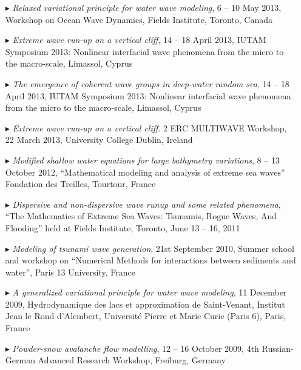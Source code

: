 \begin{itemize}
  \item[$\blacktriangleright$] \textit{Relaxed variational principle for water wave modeling}, 6 -- 10 May 2013, Workshop on Ocean Wave Dynamics, Fields Institute, Toronto, Canada

  \item[$\blacktriangleright$] \textit{Extreme wave run-up on a vertical cliff}, 14 -- 18 April 2013, IUTAM Symposium 2013: Nonlinear interfacial wave phenomena from the micro to the macro-scale, Limassol, Cyprus
  
  \item[$\blacktriangleright$] \textit{The emergence of coherent wave groups in deep-water random sea}, 14 -- 18 April 2013, IUTAM Symposium 2013: Nonlinear interfacial wave phenomena from the micro to the macro-scale, Limassol, Cyprus

  \item[$\blacktriangleright$] \textit{Extreme wave run-up on a vertical cliff}. 2 ERC MULTIWAVE Workshop, 22 March 2013, University College Dublin, Ireland

  \item[$\blacktriangleright$] \textit{Modified shallow water equations for large bathymetry variations}, 8 -- 13 October 2012, ``Mathematical modeling and analysis of extreme sea waves'' Fondation des Treilles, Tourtour, France

  \item[$\blacktriangleright$] \textit{Dispersive and non-dispersive wave runup and some related phenomena}, ``The Mathematics of Extreme Sea Waves: Tsunamis, Rogue Waves, And Flooding'' held at Fields Institute, Toronto, June 13 -- 16, 2011
  
  \item[$\blacktriangleright$] \textit{Modeling of tsunami wave generation}, 21st September 2010,  Summer school and workshop on ``Numerical Methods for interactions between sediments and water'', Paris 13 University, France
  
  \item[$\blacktriangleright$] \textit{A generalized variational principle for water wave modeling}, 11 December 2009, Hydrodynamique des lacs et approximation de Saint-Venant, Institut Jean le Rond d'Alembert, Universit\'e Pierre et Marie Curie (Paris 6), Paris, France
  
  \item[$\blacktriangleright$] \textit{Powder-snow avalanche flow modelling}, 12 -- 16 October 2009, 4th Russian-German Advanced Research Workshop, Freiburg, Germany
  

\end{itemize}
